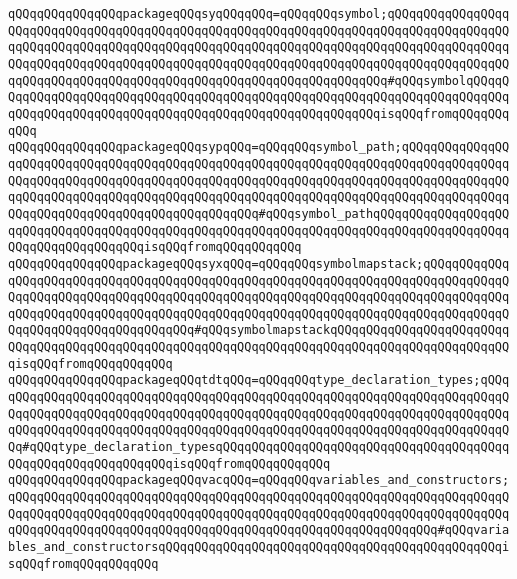 \verb|qQQqqQQqqQQqqQQqpackageqQQqsyqQQqqQQq=qQQqqQQqsymbol;qQQqqQQqqQQqqQQqqQQqqQQqqQQqqQQqqQQqqQQqqQQqqQQqqQQqqQQqqQQqqQQqqQQqqQQqqQQqqQQqqQQqqQQqqQQqqQQqqQQqqQQqqQQqqQQqqQQqqQQqqQQqqQQqqQQqqQQqqQQqqQQqqQQqqQQqqQQqqQQqqQQqqQQqqQQqqQQqqQQqqQQqqQQqqQQqqQQqqQQqqQQqqQQqqQQqqQQqqQQqqQQqqQQqqQQqqQQqqQQqqQQqqQQqqQQqqQQqqQQqqQQqqQQqqQQqqQQqqQQq#qQQqsymbolqQQqqQQqqQQqqQQqqQQqqQQqqQQqqQQqqQQqqQQqqQQqqQQqqQQqqQQqqQQqqQQqqQQqqQQqqQQqqQQqqQQqqQQqqQQqqQQqqQQqqQQqqQQqqQQqqQQqqQQqqQQqqQQqisqQQqfromqQQqqQQqqQQq|\newline
\verb|qQQqqQQqqQQqqQQqpackageqQQqsypqQQq=qQQqqQQqsymbol_path;qQQqqQQqqQQqqQQqqQQqqQQqqQQqqQQqqQQqqQQqqQQqqQQqqQQqqQQqqQQqqQQqqQQqqQQqqQQqqQQqqQQqqQQqqQQqqQQqqQQqqQQqqQQqqQQqqQQqqQQqqQQqqQQqqQQqqQQqqQQqqQQqqQQqqQQqqQQqqQQqqQQqqQQqqQQqqQQqqQQqqQQqqQQqqQQqqQQqqQQqqQQqqQQqqQQqqQQqqQQqqQQqqQQqqQQqqQQqqQQqqQQqqQQqqQQqqQQqqQQq#qQQqsymbol_pathqQQqqQQqqQQqqQQqqQQqqQQqqQQqqQQqqQQqqQQqqQQqqQQqqQQqqQQqqQQqqQQqqQQqqQQqqQQqqQQqqQQqqQQqqQQqqQQqqQQqqQQqqQQqisqQQqfromqQQqqQQqqQQq|\newline
\verb|qQQqqQQqqQQqqQQqpackageqQQqsyxqQQq=qQQqqQQqsymbolmapstack;qQQqqQQqqQQqqQQqqQQqqQQqqQQqqQQqqQQqqQQqqQQqqQQqqQQqqQQqqQQqqQQqqQQqqQQqqQQqqQQqqQQqqQQqqQQqqQQqqQQqqQQqqQQqqQQqqQQqqQQqqQQqqQQqqQQqqQQqqQQqqQQqqQQqqQQqqQQqqQQqqQQqqQQqqQQqqQQqqQQqqQQqqQQqqQQqqQQqqQQqqQQqqQQqqQQqqQQqqQQqqQQqqQQqqQQqqQQqqQQqqQQqqQQq#qQQqsymbolmapstackqQQqqQQqqQQqqQQqqQQqqQQqqQQqqQQqqQQqqQQqqQQqqQQqqQQqqQQqqQQqqQQqqQQqqQQqqQQqqQQqqQQqqQQqqQQqqQQqisqQQqfromqQQqqQQqqQQq|\newline
\verb|qQQqqQQqqQQqqQQqpackageqQQqtdtqQQq=qQQqqQQqtype_declaration_types;qQQqqQQqqQQqqQQqqQQqqQQqqQQqqQQqqQQqqQQqqQQqqQQqqQQqqQQqqQQqqQQqqQQqqQQqqQQqqQQqqQQqqQQqqQQqqQQqqQQqqQQqqQQqqQQqqQQqqQQqqQQqqQQqqQQqqQQqqQQqqQQqqQQqqQQqqQQqqQQqqQQqqQQqqQQqqQQqqQQqqQQqqQQqqQQqqQQqqQQqqQQqqQQqqQQqqQQq#qQQqtype_declaration_typesqQQqqQQqqQQqqQQqqQQqqQQqqQQqqQQqqQQqqQQqqQQqqQQqqQQqqQQqqQQqqQQqisqQQqfromqQQqqQQqqQQq|\newline
\verb|qQQqqQQqqQQqqQQqpackageqQQqvacqQQq=qQQqqQQqvariables_and_constructors;qQQqqQQqqQQqqQQqqQQqqQQqqQQqqQQqqQQqqQQqqQQqqQQqqQQqqQQqqQQqqQQqqQQqqQQqqQQqqQQqqQQqqQQqqQQqqQQqqQQqqQQqqQQqqQQqqQQqqQQqqQQqqQQqqQQqqQQqqQQqqQQqqQQqqQQqqQQqqQQqqQQqqQQqqQQqqQQqqQQqqQQqqQQqqQQqqQQqqQQq#qQQqvariables_and_constructorsqQQqqQQqqQQqqQQqqQQqqQQqqQQqqQQqqQQqqQQqqQQqqQQqisqQQqfromqQQqqQQqqQQq|\newline
